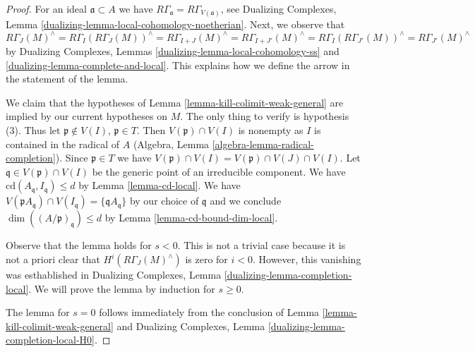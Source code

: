 \begin{proof}
For an ideal $\mathfrak a \subset A$ we have
$R\Gamma_\mathfrak a = R\Gamma_{V(\mathfrak a)}$, see
Dualizing Complexes, Lemma \ref{dualizing-lemma-local-cohomology-noetherian}.
Next, we observe that
$$
R\Gamma_J(M)^\wedge =
R\Gamma_I(R\Gamma_J(M))^\wedge =
R\Gamma_{I + J}(M)^\wedge =
R\Gamma_{I + J'}(M)^\wedge =
R\Gamma_I(R\Gamma_{J'}(M))^\wedge =
R\Gamma_{J'}(M)^\wedge
$$
by Dualizing Complexes, Lemmas \ref{dualizing-lemma-local-cohomology-ss} and
\ref{dualizing-lemma-complete-and-local}.
This explains how we define the arrow in the statement of the lemma.

\medskip\noindent
We claim that the hypotheses of Lemma \ref{lemma-kill-colimit-weak-general}
are implied by our current hypotheses on $M$.
The only thing to verify is hypothesis (3).
Thus let $\mathfrak p \not \in V(I)$, $\mathfrak p \in T$.
Then $V(\mathfrak p) \cap V(I)$ is nonempty as $I$ is
contained in the radical of $A$
(Algebra, Lemma \ref{algebra-lemma-radical-completion}).
Since $\mathfrak p \in T$ we have
$V(\mathfrak p) \cap V(I) = V(\mathfrak p) \cap V(J) \cap V(I)$.
Let $\mathfrak q \in V(\mathfrak p) \cap V(I)$ be the
generic point of an irreducible component.
We have $\text{cd}(A_\mathfrak q, I_\mathfrak q) \leq d$
by Lemma \ref{lemma-cd-local}.
We have $V(\mathfrak pA_\mathfrak q) \cap V(I_\mathfrak q) =
\{\mathfrak qA_\mathfrak q\}$ by our choice of $\mathfrak q$
and we conclude $\dim((A/\mathfrak p)_\mathfrak q) \leq d$
by Lemma \ref{lemma-cd-bound-dim-local}.

\medskip\noindent
Observe that the lemma holds for $s < 0$. This is not a trivial case because
it is not a priori clear that $H^i(R\Gamma_J(M)^\wedge)$
is zero for $i < 0$. However, this vanishing was esthablished in
Dualizing Complexes, Lemma \ref{dualizing-lemma-completion-local}.
We will prove the lemma by induction for $s \geq 0$.

\medskip\noindent
The lemma for $s = 0$ follows immediately from
the conclusion of Lemma \ref{lemma-kill-colimit-weak-general}
and Dualizing Complexes, Lemma \ref{dualizing-lemma-completion-local-H0}.


\end{proof}
